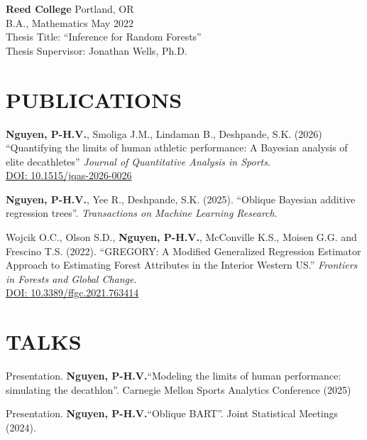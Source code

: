 \documentclass[margin]{res}
\def\pvn{\textbf{Nguyen, P-H.V.}}
\begin{document}
\begin{resume}
                {\bf Reed College} \hfill Portland, OR \\
                B.A., Mathematics \hfill May 2022 \\
                Thesis Title: ``Inference for Random Forests'' \\
                Thesis Supervisor: Jonathan Wells, Ph.D.
  
  


\section{PUBLICATIONS}

\pvn, Smoliga J.M., Lindaman B., Deshpande, S.K. (2026) ``Quantifying the limits of human athletic performance: A Bayesian analysis of elite decathletes'' \textit{Journal of Quantitative Analysis in Sports}. \\
\href{https://doi.org/10.1515/jqas-2026-0026}{DOI: 10.1515/jqas-2026-0026}

\pvn, Yee R., Deshpande, S.K. (2025). ``Oblique Bayesian additive regression trees''. \textit{Transactions on Machine Learning Research}.

Wojcik O.C., Olson S.D., \pvn, McConville K.S., Moisen G.G. and Frescino T.S. (2022). ``GREGORY: A Modified Generalized Regression Estimator Approach to Estimating Forest Attributes in the Interior Western US.'' \textit{Frontiers in Forests and Global Change}. \\ \href{https://doi.org/10.3389/ffgc.2021.763414}{DOI: 10.3389/ffgc.2021.763414}




\section{TALKS}

Presentation. \pvn ``Modeling the limits of human performance: simulating the decathlon''. Carnegie Mellon Sports Analytics Conference (2025) 

Presentation. \pvn ``Oblique BART''. Joint Statistical Meetings (2024).


\end{resume}
\end{document}
